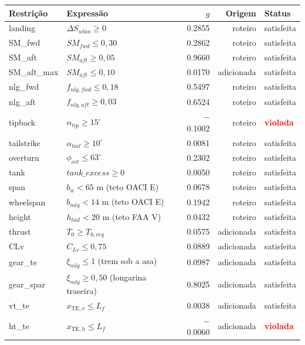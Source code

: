 \begin{tabular}{llrrl}
\toprule
Restrição & Expressão & $g$ & Origem & Status \\
\midrule
landing & $\Delta S_{wlan} \geq 0$ & 0.2855 & roteiro & satisfeita \\
SM\_fwd & $SM_{fwd} \leq 0{,}30$ & 0.2862 & roteiro & satisfeita \\
SM\_aft & $SM_{aft} \geq 0{,}05$ & 0.9660 & roteiro & satisfeita \\
SM\_aft\_max & $SM_{aft} \leq 0{,}10$ & 0.0170 & adicionada & satisfeita \\
nlg\_fwd & $f_{nlg,fwd} \leq 0{,}18$ & 0.5497 & roteiro & satisfeita \\
nlg\_aft & $f_{nlg,aft} \geq 0{,}03$ & 0.6524 & roteiro & satisfeita \\
tipback & $\alpha_{tip} \geq 15^\circ$ & $-$0.1002 & roteiro & \textcolor{red}{\textbf{violada}} \\
tailstrike & $\alpha_{tail} \geq 10^\circ$ & 0.0081 & roteiro & satisfeita \\
overturn & $\phi_{ovt} \leq 63^\circ$ & 0.2302 & roteiro & satisfeita \\
tank & $tank\_excess \geq 0$ & 0.0050 & roteiro & satisfeita \\
span & $b_w < 65$ m (teto OACI E) & 0.0678 & roteiro & satisfeita \\
wheelspan & $b_{mlg} < 14$ m (teto OACI E) & 0.1942 & roteiro & satisfeita \\
height & $h_{tail} < 20$ m (teto FAA V) & 0.0432 & roteiro & satisfeita \\
thrust & $T_0 \geq T_{0,req}$ & 0.0575 & adicionada & satisfeita \\
CLv & $C_{Lv} \leq 0{,}75$ & 0.0889 & adicionada & satisfeita \\
gear\_te & $\xi_{mlg} \leq 1$ (trem sob a asa) & 0.0987 & adicionada & satisfeita \\
gear\_spar & $\xi_{mlg} \geq 0{,}50$ (longarina traseira) & 0.8025 & adicionada & satisfeita \\
vt\_te & $x_{\mathrm{TE},v} \leq L_f$ & 0.0038 & adicionada & satisfeita \\
ht\_te & $x_{\mathrm{TE},h} \leq L_f$ & $-$0.0060 & adicionada & \textcolor{red}{\textbf{violada}} \\
\bottomrule
\end{tabular}